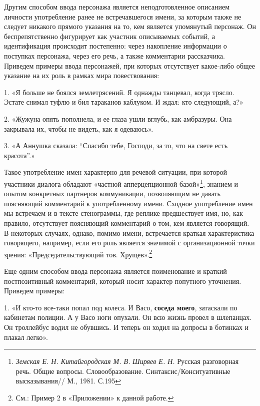 \documentclass{kursa4}
\begin{document}
    {\color[rgb]{0.2,0.2,0.2}
    Другим способом ввода персонажа является неподготовленное
    описанием личности употребление ранее не встречавшегося имени, за
    которым также не следует никакого прямого указания на то, кем является
    упомянутый персонаж. Он беспрепятственно фигурирует как участник
    описываемых событий, а идентификация происходит постепенно: через
    накопление информации о поступках персонажа, через его речь, а также
    комментарии рассказчика. Приведем примеры ввода персонажей, при которых
    отсутствует какое-либо общее указание на их роль в рамках мира
    повествования: }

    {\color[rgb]{0.2,0.2,0.2}
    1. «Я больше не боялся землетрясений. Я однажды танцевал, когда
    трясло. Эстате снимал туфлю и бил тараканов каблуком. И ждал: кто
    следующий, а?»}

    {\color[rgb]{0.2,0.2,0.2}
    2. «Жужуна опять пополнела, и ее глаза ушли вглубь, как амбразуры.
    Она закрывала их, чтобы не видеть, как я одеваюсь». }

    {\color[rgb]{0.2,0.2,0.2}
    3. «А Аннушка сказала: “Спасибо тебе, Господи, за то, что на свете
    есть красота”.»}


    \bigskip

    {\color[rgb]{0.2,0.2,0.2}
    Такое употребление имен характерно для речевой ситуации, при которой
    участники диалога обладают «частной апперцепционной
    базой»\footnote{\textit{Земская Е. Н. Китайгородская М. В.
    }\textit{Ширяев Е. Н. }Русская разговорная речь. Общие вопросы.
    Словообразование. Синтаксис/Конситуативные высказывания// М., 1981.
    С.195}, знанием и опытом конкретных партнеров коммуникации,
    позволяющим не давать поясняющий комментарий к употребленному имени.
    Сходное употребление имен мы встречаем и в тексте стенограммы, где
    реплике предшествует имя, но, как правило, отсутствует поясняющий
    комментарий о том, кем является говорящий. В некоторых случаях, однако,
    помимо имени, встречается краткая характеристика говорящего, например,
    если его роль является значимой с организационной точки зрения:
    «Председательствующий тов. Хрущев».\footnote{См.: Пример 2 в
    «Приложении» к данной работе.} }

    {\color[rgb]{0.2,0.2,0.2}
    Еще одним способом ввода персонажа является поименование и краткий
    постпозитивный комментарий, который носит характер попутного уточнения.
    Приведем примеры:}

    {\color[rgb]{0.2,0.2,0.2}
    1. «И кто-то все-таки попал под колеса. И Васо, \textbf{соседа
    моего}, затаскали по кабинетам полиции. А у Васо ноги опухали. Он всю
    жизнь провел в шлепанцах. Он троллейбус водил не обувшись. И теперь он
    ходил на допросы в ботинках и плакал легко».}
\end{document}
